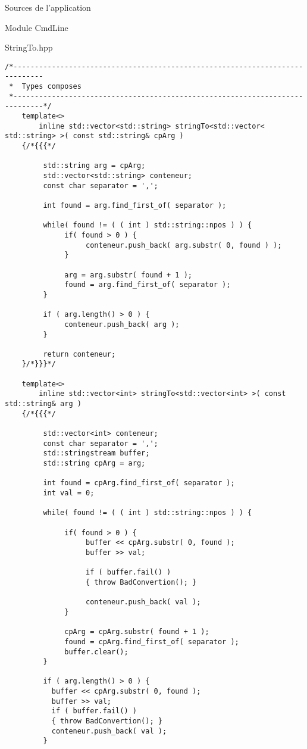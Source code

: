 \documentclass{article}
\begin{document}
\begin{section}{Sources de l'application}
\begin{subsection}{Module CmdLine}
\begin{paragraph}{StringTo.hpp}
\begin{verbatim}
/*-----------------------------------------------------------------------------
 *  Types composes
 *-----------------------------------------------------------------------------*/
    template<>
        inline std::vector<std::string> stringTo<std::vector< std::string> >( const std::string& cpArg )
    {/*{{{*/

         std::string arg = cpArg;
         std::vector<std::string> conteneur;
         const char separator = ',';

         int found = arg.find_first_of( separator );

         while( found != ( ( int ) std::string::npos ) ) {
              if( found > 0 ) {
                   conteneur.push_back( arg.substr( 0, found ) );
              }

              arg = arg.substr( found + 1 );
              found = arg.find_first_of( separator );
         }

         if ( arg.length() > 0 ) {
              conteneur.push_back( arg );
         }

         return conteneur;
    }/*}}}*/
    
    template<>
        inline std::vector<int> stringTo<std::vector<int> >( const std::string& arg )
    {/*{{{*/

         std::vector<int> conteneur;
         const char separator = ',';
         std::stringstream buffer;
         std::string cpArg = arg;

         int found = cpArg.find_first_of( separator );
         int val = 0;

         while( found != ( ( int ) std::string::npos ) ) {

              if( found > 0 ) {
                   buffer << cpArg.substr( 0, found );
                   buffer >> val;
                   
                   if ( buffer.fail() )
                   { throw BadConvertion(); }

                   conteneur.push_back( val );
              }

              cpArg = cpArg.substr( found + 1 );
              found = cpArg.find_first_of( separator );
              buffer.clear();
         }

         if ( arg.length() > 0 ) {
           buffer << cpArg.substr( 0, found );
           buffer >> val;
           if ( buffer.fail() )
           { throw BadConvertion(); }
           conteneur.push_back( val );
         }


\end{verbatim}
\end{paragraph}
\end{subsection}
\end{section}
\end{document}
